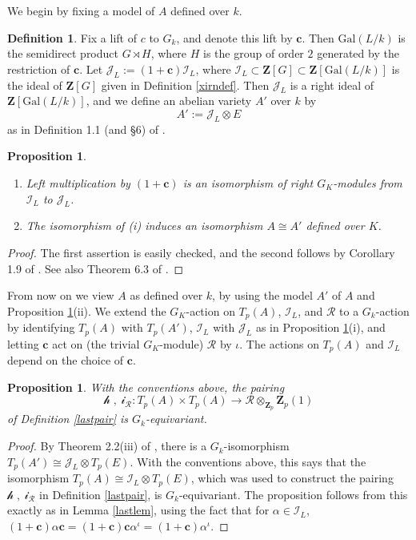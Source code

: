 \documentclass[reqno]{amsart}
\newtheorem{prop}[thm]{Proposition}
\theoremstyle{definition}
\newtheorem{defn}[thm]{Definition}
\def\Z{\mathbf{Z}}
\def\Zp{\Z_p}
\def\cR{\mathcal{R}}
\def\I{\mathcal{I}}
\def\J{\mathcal{J}}
\def\ld{\mathcal{h}}
\def\rd{\mathcal{i}}
\def\Gal{\mathrm{Gal}}
\def\c{\mathbf{c}}
\def\k{k}
\def\semidirect{\rtimes}
\def\pair#1#2{\ld#1,#2\rd}
\begin{document}
We begin by fixing a model of $A$ defined over $\k$.  

\begin{defn}
\label{newadef}
Fix a lift of $c$ to $G_{\k}$, and denote this lift by $\c$.  
Then $\Gal(L/\k)$ is the semidirect product $G \semidirect H$, 
where $H$ is the group of order $2$ generated by the restriction 
of $\c$.  Let $\J_L := (1+\c)\I_L$, where 
$\I_L \subset \Z[G] \subset \Z[\Gal(L/\k)]$ is 
the ideal of $\Z[G]$ given in Definition \ref{xirndef}.  
Then $\J_L$ is a right ideal of $\Z[\Gal(L/\k)]$, 
and we define an abelian variety $A'$ over $\k$ by
$$
A' := \J_L \otimes E
$$
as in Definition 1.1 (and \S6) of \cite{prim}. 
\end{defn}

\begin{prop}
\label{secondtolast}
\begin{enumerate}
\item
Left multiplication by $(1+\c)$ is an isomorphism of right $G_K$-modules  
from $\I_L$ to $\J_L$.
\item
The isomorphism of (i) induces an isomorphism 
$A \cong A'$ defined over $K$.  
\end{enumerate}
\end{prop}

\begin{proof}
The first assertion is easily checked, and the second 
follows by Corollary 1.9 of \cite{prim}.  See also Theorem 6.3 of \cite{prim}.
\end{proof}

From now on we view $A$ as defined over $\k$, by using the model 
$A'$ of $A$ and Proposition \ref{secondtolast}(ii).  
We extend the $G_K$-action on $T_p(A)$, $\I_L$, and $\cR$ to a $G_\k$-action 
by identifying $T_p(A)$ with $T_p(A')$, $\I_L$ with $\J_L$ as in 
Proposition \ref{secondtolast}(i), and 
letting $\c$ act on (the trivial $G_K$-module) $\cR$ by $\iota$.  
The actions on $T_p(A)$ and $\I_L$ depend on the choice of $\c$.

\begin{prop}
\label{lastprop}
With the conventions above, the pairing 
$$\pair{\;}{\;}_\cR : T_p(A) \times T_p(A) \to \cR \otimes_{\Zp} \Zp(1)$$ 
of Definition \ref{lastpair} is $G_\k$-equivariant.
\end{prop}

\begin{proof}
By Theorem 2.2(iii) of \cite{prim}, 
there is a $G_\k$-isomorphism $T_p(A') \cong \J_L \otimes T_p(E)$. 
With the conventions above, this says that the isomorphism 
$T_p(A) \cong \I_L \otimes T_p(E)$, which was used to construct the pairing 
$\pair{\;}{\;}_\cR$ in Definition \ref{lastpair}, is $G_\k$-equivariant.
The proposition follows from this exactly as in Lemma \ref{lastlem}, 
using the fact that for $\alpha \in \I_L$, 
$(1+\c)\alpha\c = (1+\c)\c\alpha^\iota = (1+\c)\alpha^\iota$.
\end{proof}
\end{document}
